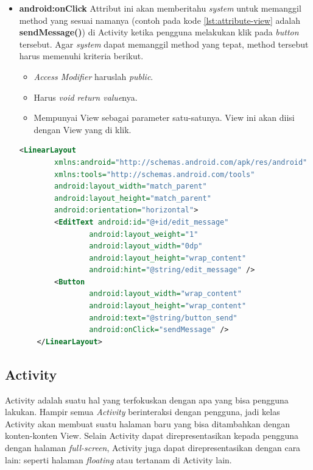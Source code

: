 \begin{itemize}
	\item \textbf{android:onClick}
	Attribut ini akan memberitahu \textit{system} untuk memanggil method yang sesuai namanya (contoh pada kode \ref{lst:attribute-view} adalah \textbf{sendMessage()}) di Activity ketika pengguna melakukan klik pada \textit{button} tersebut. Agar \textit{system} dapat memanggil method yang tepat, method tersebut harus memenuhi kriteria berikut.
	\begin{itemize}
		\item \textit{Access Modifier} haruslah \textit{public}.
		\item Harus \textit{void return value}nya.
		\item Mempunyai View sebagai parameter satu-satunya. View ini akan diisi dengan View yang di klik.
	\end{itemize}
\begin{lstlisting}[caption={Contoh kode file XML pada folder layout},label={lst:attribute-view},language=xml]
	<LinearLayout
		xmlns:android="http://schemas.android.com/apk/res/android"
		xmlns:tools="http://schemas.android.com/tools"
		android:layout_width="match_parent"
		android:layout_height="match_parent"
		android:orientation="horizontal">
		<EditText android:id="@+id/edit_message"
				android:layout_weight="1"
				android:layout_width="0dp"
				android:layout_height="wrap_content"
				android:hint="@string/edit_message" />
		<Button
				android:layout_width="wrap_content"
				android:layout_height="wrap_content"
				android:text="@string/button_send"
				android:onClick="sendMessage" />
	</LinearLayout>
\end{lstlisting}
\end{itemize}


\subsection{Activity}
\label{sec:activity}
\cite{android_developers}
Activity adalah suatu hal yang terfokuskan dengan apa yang bisa pengguna lakukan. Hampir semua \textit{Activity} berinteraksi dengan pengguna, jadi kelas Activity akan membuat suatu halaman baru yang bisa ditambahkan dengan konten-konten View. Selain Activity dapat direpresentasikan kepada pengguna dengan halaman \textit{full-screen}, Activity juga dapat direpresentasikan dengan cara lain: seperti halaman \textit{floating} atau tertanam di Activity lain.

